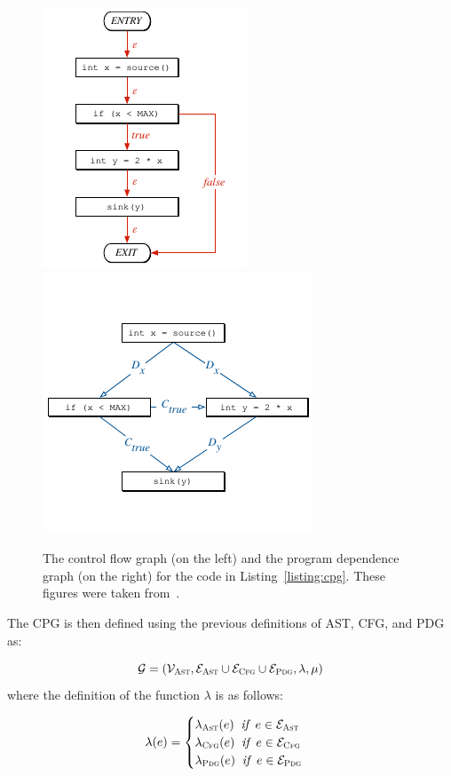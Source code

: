 \begin{figure}[t]
  \centering
  \centering
  \includegraphics[width=0.36\linewidth]{figures/CFG.pdf}\hfill
  \includegraphics[width=0.48\linewidth]{figures/PDG.pdf}
  \caption{The control flow graph (on the left) and the program dependence graph (on the right) for the code in Listing~\ref{listing:cpg}. These figures were taken from~\cite{CPG-yamaguchi2014modeling}.}
  \label{figure:CFG-PDG}
\end{figure}

The CPG is then defined using the previous definitions of AST, CFG, and PDG as: 

\begin{equation*}
    \mathcal{G} = ( \mathcal{V}_{\textsc{Ast}}, \mathcal{E}_{\textsc{Ast}} \cup \mathcal{E}_{\textsc{Cfg}} \cup \mathcal{E}_{\textsc{Pdg}}, \lambda, \mu )
\end{equation*}
where the definition of the function $\lambda$ is as follows:

  \begin{equation*}
      \lambda(e) = 
      \begin{cases} 
      \lambda_{\textsc{Ast}} (e) \;\; \textit{if} \;\; e \in \mathcal{E}_{\textsc{Ast}} \\
      \lambda_{\textsc{Cfg}} (e) \;\; \textit{if} \;\; e \in \mathcal{E}_{\textsc{Cfg}} \\
      \lambda_{\textsc{Pdg}} (e) \;\; \textit{if} \;\; e \in \mathcal{E}_{\textsc{Pdg}} 
   \end{cases}
  \end{equation*}

